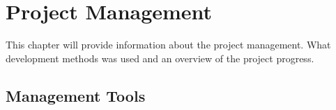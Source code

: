 \chapter{Project Management}
This chapter will provide information about the project management. What development methods was used and an overview of the project progress.
\newpage
\section{Management Tools}



\newpage

\newpage
